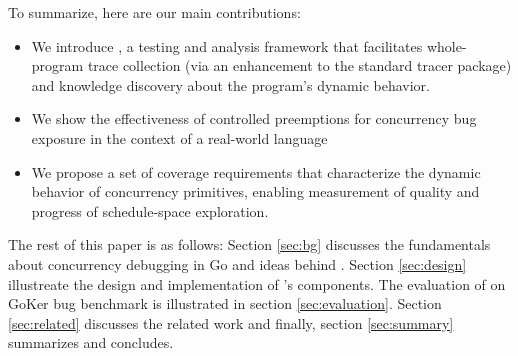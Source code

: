 To summarize, here are our main contributions:
\begin{itemize}
    \item We introduce \goat, a testing and analysis framework that facilitates whole-program trace collection (via an enhancement to the standard tracer package) and knowledge discovery about the program's dynamic behavior.
    \item We show the effectiveness of controlled preemptions for concurrency bug exposure in the context of a real-world language
    \item We propose a set of coverage requirements that characterize the dynamic behavior of concurrency primitives, enabling measurement of quality and progress of schedule-space exploration.
\end{itemize}

The rest of this paper is as follows: Section \ref{sec:bg} discusses the fundamentals about concurrency debugging in Go and ideas behind \goat. Section \ref{sec:design} illustreate the design and implementation of \goat's components. The evaluation of \goat on GoKer bug benchmark is illustrated in section \ref{sec:evaluation}. Section \ref{sec:related} discusses the related work and finally, section \ref{sec:summary} summarizes and concludes.
